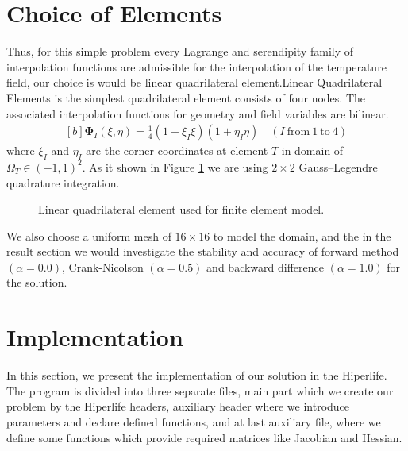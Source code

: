 \documentclass[]{article}
\begin{document}
\section{Choice of Elements} \label{sec: coe}
Thus, for this simple problem every Lagrange and serendipity family of interpolation functions are admissible for the interpolation of the temperature field, our choice is would be linear quadrilateral element.Linear  Quadrilateral Elements is the simplest quadrilateral element consists of four nodes. The associated interpolation functions for geometry and ﬁeld variables are bilinear.
\begin{equation}\label{eq11}
	\begin{aligned}[b]
		\boldsymbol{\Phi}_{I}(\xi, \eta) = \frac{1}{4}(1+\xi_I\xi)(1+\eta_I\eta) \quad (I \ \text{from} \ 1 \ \text{to} \ 4)
	\end{aligned}
\end{equation}
where $\xi_{I}$ and $\eta_{I}$ are the corner coordinates at element $T$ in domain of $\Omega_{T} \in (-1,1)^2$. As it shown in Figure \ref{fig_el} we are using $2 \times 2$ Gauss–Legendre quadrature integration.
\begin{figure}[htbp]
	\centering
	
	\caption{Linear quadrilateral element used for finite element model.}
	\label{fig_el}
\end{figure}

We also choose a uniform mesh of $16 \times 16$ to model the domain, and the in the result section we would investigate the stability and accuracy of forward method $(\alpha = 0.0)$, Crank-Nicolson $(\alpha = 0.5)$ and backward difference $(\alpha = 1.0)$ for the solution.
\section{Implementation} \label{sec: im}
In this section, we present the implementation of our solution in the Hiperlife. The program is divided into three separate files, main part which we create our problem by the Hiperlife headers, auxiliary header where we introduce parameters and declare defined functions, and at last auxiliary file, where we define some functions which provide required matrices like Jacobian and Hessian.
\end{document}
